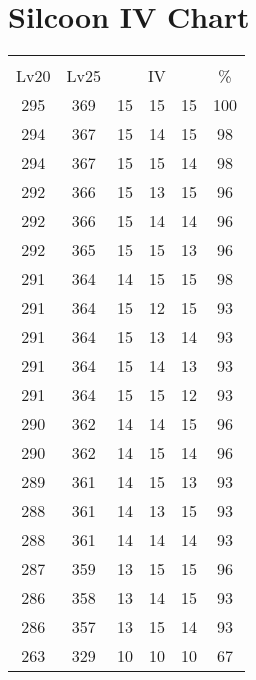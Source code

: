 \documentclass{article}%
\begin{document}
%
\normalsize%
\section{Silcoon IV Chart}%
\label{sec:Silcoon IV Chart}%
\renewcommand{\arraystretch}{1.5}%
\begin{tabular}{|c|c|c|c|c|c|}%
\hline%
\multicolumn{6}{|c|}{\textcolor{white}{ 
\linebreak{Silcoon}
}%
\cellcolor{black}}\\%
\multicolumn{1}{|c}{Lv20}&\multicolumn{1}{c|}{Lv25}&\multicolumn{3}{c|}{IV}&\multicolumn{1}{|c|}{\%}\\%
\hline%
\rowcolor{color100}%
295&369&15&15&15&100\\%
\hline%
\rowcolor{color98}%
294&367&15&14&15&98\\%
\hline%
\rowcolor{color98}%
294&367&15&15&14&98\\%
\hline%
\rowcolor{color96}%
292&366&15&13&15&96\\%
\hline%
\rowcolor{color96}%
292&366&15&14&14&96\\%
\hline%
\rowcolor{color96}%
292&365&15&15&13&96\\%
\hline%
\rowcolor{color98}%
291&364&14&15&15&98\\%
\hline%
\rowcolor{color93}%
291&364&15&12&15&93\\%
\hline%
\rowcolor{color93}%
291&364&15&13&14&93\\%
\hline%
\rowcolor{color93}%
291&364&15&14&13&93\\%
\hline%
\rowcolor{color93}%
291&364&15&15&12&93\\%
\hline%
\rowcolor{color96}%
290&362&14&14&15&96\\%
\hline%
\rowcolor{color96}%
290&362&14&15&14&96\\%
\hline%
\rowcolor{color93}%
289&361&14&15&13&93\\%
\hline%
\rowcolor{color93}%
288&361&14&13&15&93\\%
\hline%
\rowcolor{color93}%
288&361&14&14&14&93\\%
\hline%
\rowcolor{color96}%
287&359&13&15&15&96\\%
\hline%
\rowcolor{color93}%
286&358&13&14&15&93\\%
\hline%
\rowcolor{color93}%
286&357&13&15&14&93\\%
\hline%
\rowcolor{color91}%
263&329&10&10&10&67\\%
\end{tabular}

%
\end{document}
